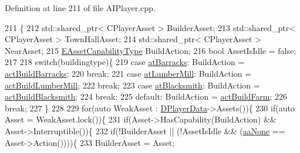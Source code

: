 Definition at line 211 of file A\+I\+Player.\+cpp.


\begin{DoxyCode}
211                                                                                                          \{
212     std::shared\_ptr< CPlayerAsset > BuilderAsset;
213     std::shared\_ptr< CPlayerAsset > TownHallAsset;
214     std::shared\_ptr< CPlayerAsset > NearAsset;
215     \hyperlink{GameDataTypes_8h_a35b98ce26aca678b03c6f9f76e4778ce}{EAssetCapabilityType} BuildAction;
216     \textcolor{keywordtype}{bool} AssetIsIdle = \textcolor{keyword}{false};
217     
218     \textcolor{keywordflow}{switch}(buildingtype)\{
219         \textcolor{keywordflow}{case} \hyperlink{GameDataTypes_8h_a5600d4fc433b83300308921974477feca1cbf6c944f30d615a247eef1f57b2230}{atBarracks}:    BuildAction = \hyperlink{GameDataTypes_8h_a35b98ce26aca678b03c6f9f76e4778ceaea47e79df21160eb97064a18e6d36cac}{actBuildBarracks};
220                             \textcolor{keywordflow}{break};
221         \textcolor{keywordflow}{case} \hyperlink{GameDataTypes_8h_a5600d4fc433b83300308921974477feca7bb38316bc3193b5c9ec67ea6aad549c}{atLumberMill}:  BuildAction = \hyperlink{GameDataTypes_8h_a35b98ce26aca678b03c6f9f76e4778ceaea7fb8009561a58e7b9f2cf741989242}{actBuildLumberMill};
222                             \textcolor{keywordflow}{break};
223         \textcolor{keywordflow}{case} \hyperlink{GameDataTypes_8h_a5600d4fc433b83300308921974477feca2b2badd6cba3212eef87ac295bf9642e}{atBlacksmith}:  BuildAction = \hyperlink{GameDataTypes_8h_a35b98ce26aca678b03c6f9f76e4778cea45224b077989530810879da4e225eac7}{actBuildBlacksmith};
224                             \textcolor{keywordflow}{break};
225         \textcolor{keywordflow}{default}:            BuildAction = \hyperlink{GameDataTypes_8h_a35b98ce26aca678b03c6f9f76e4778cea4de8df4d0a9c3bb6fe33e380bc407078}{actBuildFarm};
226                             \textcolor{keywordflow}{break};
227     \}
228 
229     \textcolor{keywordflow}{for}(\textcolor{keyword}{auto} WeakAsset : \hyperlink{classCAIPlayer_a83b5113c8f7e80df54940b647c5ee2e6}{DPlayerData}->Assets())\{
230         \textcolor{keywordflow}{if}(\textcolor{keyword}{auto} Asset = WeakAsset.lock())\{
231             \textcolor{keywordflow}{if}(Asset->HasCapability(BuildAction) && Asset->Interruptible())\{
232                 \textcolor{keywordflow}{if}(!BuilderAsset || (!AssetIsIdle && (\hyperlink{GameDataTypes_8h_ab47668e651a3032cfb9c40ea2d60d670ac17cc5a0035320c060d7f8074143b507}{aaNone} == Asset->Action())))\{
233                     BuilderAsset = Asset;

\end{DoxyCode}
